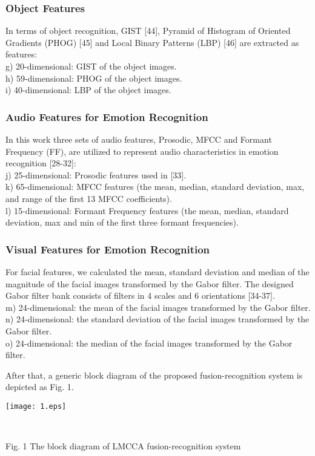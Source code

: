\documentclass[journal]{IEEEtran}
\begin{document}
\subsubsection{Object Features}
In terms of object recognition, GIST [44], Pyramid of Histogram of Oriented Gradients (PHOG) [45] and Local Binary Patterns (LBP) [46] are extracted as features:\\
g) 20-dimensional: GIST of the object images.\\
h) 59-dimensional: PHOG of the object images.\\
i) 40-dimensional: LBP of the object images.
\subsubsection{Audio Features for Emotion Recognition}
In this work three sets of audio features, Prosodic, MFCC and Formant Frequency (FF), are utilized to represent audio characteristics in emotion recognition [28-32]:\\
j) 25-dimensional: Prosodic features used in [33].\\
k) 65-dimensional: MFCC features (the mean, median, standard deviation, max, and range of the first 13 MFCC coefficients).\\
l) 15-dimensional: Formant Frequency features (the mean, median, standard deviation, max and min of the first three formant frequencies).
\subsubsection{Visual Features for Emotion Recognition}
For facial features, we calculated the mean, standard deviation and median of the magnitude of the facial images transformed by the Gabor filter. The designed Gabor filter bank consists of filters in 4 scales and 6 orientations [34-37].\\
m) 24-dimensional: the mean of the facial images transformed by the Gabor filter.\\
n) 24-dimensional: the standard deviation of the facial images transformed by the Gabor filter.\\
o) 24-dimensional: the median of the facial images transformed by the Gabor filter.\\\indent

After that, a generic block diagram of the proposed fusion-recognition system is depicted as Fig. 1.\\
\centerline {\texttt{[image: 1.eps]}}\\  \centerline {Fig. 1 The block diagram of LMCCA fusion-recognition system}\\\indent
\end{document}
